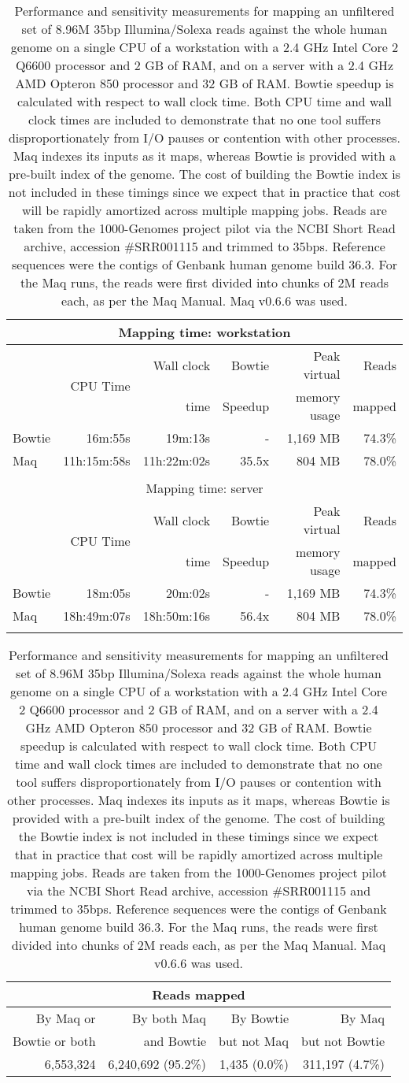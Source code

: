 \documentclass[letterpaper]{article}
\begin{document}
\begin{table}[tp]
\scriptsize
\begin{tabular*}{1.00\textwidth}{@{\extracolsep{\fill}} lrrrrr}
\multicolumn{6}{c}{\small{Mapping time: workstation}} \\[3pt]
\toprule
 & \multirow{2}{*}{CPU Time} & Wall clock & Bowtie  & Peak virtual & Reads  \\
 &                            & time       & Speedup & memory usage & mapped \\[3pt]
\toprule
Bowtie & 16m:55s & 19m:13s & - & 1,169 MB & 74.3\%\\\midrule
Maq & 11h:15m:58s & 11h:22m:02s & 35.5x & 804 MB & 78.0\%\\
\toprule\\[1pt]
\multicolumn{6}{c}{\small{Mapping time: server}} \\[3pt]
\toprule
 & \multirow{2}{*}{CPU Time} & Wall clock & Bowtie  & Peak virtual & Reads  \\
 &                            & time       & Speedup & memory usage & mapped \\[3pt]
\toprule
Bowtie & 18m:05s & 20m:02s & - & 1,169 MB & 74.3\%\\\midrule
Maq & 18h:49m:07s & 18h:50m:16s & 56.4x & 804 MB & 78.0\%\\
\bottomrule\\[1pt]
\end{tabular*}
\begin{tabular*}{1.00\textwidth}{@{\extracolsep{\fill}} rrrr}
\multicolumn{4}{c}{\small{Reads mapped}} \\[3pt]
\toprule 
By Maq or      & By both Maq & By Bowtie   & By Maq         \\ 
Bowtie or both & and Bowtie  & but not Maq & but not Bowtie \\ 
\toprule
6,553,324 & 6,240,692 (95.2\%) & 1,435 (0.0\%) & 311,197 (4.7\%) \\ 
\bottomrule
\end{tabular*}
\caption{Performance and sensitivity measurements for mapping an unfiltered
set of 8.96M 35bp Illumina/Solexa reads
against the whole human genome on a single CPU of a workstation with a 2.4 GHz
Intel Core 2 Q6600 processor and 2 GB of RAM, and on a server with a 2.4 GHz
AMD Opteron 850 processor and 32 GB of RAM. Bowtie speedup is calculated with
respect to wall clock time. Both CPU time and wall clock times are included to
demonstrate that no one tool suffers disproportionately from I/O pauses or
contention with other processes. Maq indexes its inputs as it maps,
whereas Bowtie is provided with a pre-built index of the
genome.  The cost of building the Bowtie index is not included in these timings
since we expect that in practice that cost will be rapidly amortized across
multiple mapping jobs. Reads are taken from the 1000-Genomes project pilot via
the NCBI Short Read archive, accession \#SRR001115 and trimmed to 35bps.
Reference sequences were the contigs of Genbank human genome build 36.3. For
the Maq runs, the reads were first
divided into chunks of 2M reads each, as per the Maq Manual. Maq
v0.6.6 was used. }
\end{table}
\end{document}
